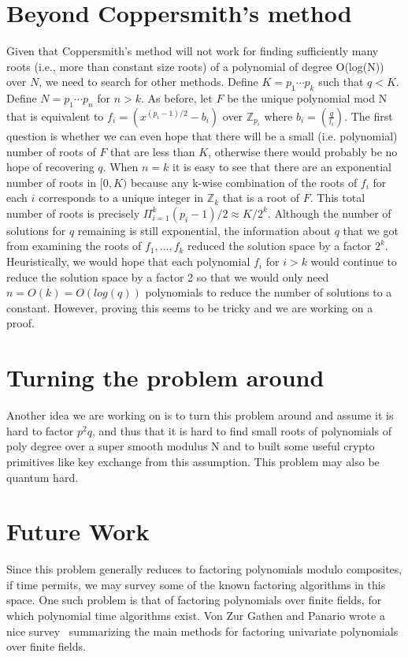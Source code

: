 \documentclass[letterpaper,twocolumn,10pt]{article}
\begin{document}
\section{Beyond Coppersmith's method} 
Given that Coppersmith's method will not work for finding sufficiently many roots (i.e., more than constant size roots) of a polynomial of degree O(log(N)) over $N$, we need to search for other methods. Define $K = p_1 \cdots p_k$ such that $q < K$. Define $N = p_1 \cdots p_n$ for $n > k$. As before, let $F$ be the unique polynomial mod N that is equivalent to $f_i = (x^{(p_i - 1)/2} - b_i)$ over $\mathbb{Z}_{p_i}$ where $b_i =  \left(\frac{q}{l_i}\right)$. The first question is whether we can even hope that there will be a small (i.e. polynomial) number of roots of $F$ that are less than $K$, otherwise there would probably be no hope of recovering $q$. When $n = k$ it is easy to see that there are an exponential number of roots in $[0, K)$ because any k-wise combination of the roots of $f_i$ for each $i$ corresponds to a unique integer in $\mathbb{Z}_k$ that is a root of $F$. This total number of roots is precisely $\Pi_{i= 1}^k (p_i - 1)/2 \approx K/2^k$. Although the number of solutions for $q$ remaining is still exponential, the information about $q$ that we got from examining the roots of $f_1,...,f_k$ reduced the solution space by a factor $2^k$. Heuristically, we would hope that each polynomial $f_i$ for $i > k$ would continue to reduce the solution space by a factor 2 so that we would only need $n = O(k) = O(log(q))$ polynomials to reduce the number of solutions to a constant. However, proving this seems to be tricky and we are working on a proof. 

\section{Turning the problem around} 
Another idea we are working on is to turn this problem around and assume it is hard to factor $p^2q$, and thus that it is hard to find small roots of polynomials of poly degree over a super smooth modulus N and to built some useful crypto primitives like key exchange from this assumption. This problem may also be quantum hard. 

\section{Future Work}

Since this problem generally reduces to factoring polynomials modulo composites, if time permits, we may survey some of the known factoring algorithms in this space. One such problem is that of factoring polynomials over finite fields, for which polynomial time algorithms exist. Von Zur Gathen and Panario wrote a nice survey~\cite{Gathen} summarizing the main methods for factoring univariate polynomials over finite fields. 



{\footnotesize 
}


\end{document}
